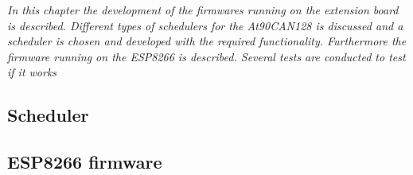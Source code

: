 \textit{In this chapter the development of the firmwares running on the extension board is described. Different types of schedulers for the At90CAN128 is discussed and a scheduler is chosen and developed with the required functionality. Furthermore the firmware running on the ESP8266 is described. Several tests are conducted to test if it works}
\subsection{Scheduler}

%

\subsection{ESP8266 firmware} \label{sec:exp8266_firmware}


\newpage

